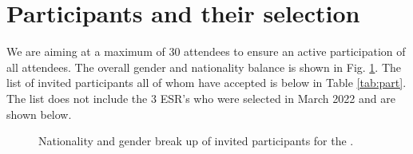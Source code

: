 \section{Participants and their selection}

We are aiming at a maximum of 30 attendees to ensure an active
participation of all attendees. The overall gender and nationality
balance is shown in Fig. \ref{fig:country}. The list of invited
participants all of whom have accepted is below in Table
\ref{tab:part}. The list does not include the 3 ESR's who were
selected in March 2022 and are shown below.

\begin{figure}[!htb]
  \centering 
  \caption{Nationality and gender break up of invited participants for
    the \sympe.}
  \label{fig:country}
\end{figure}






